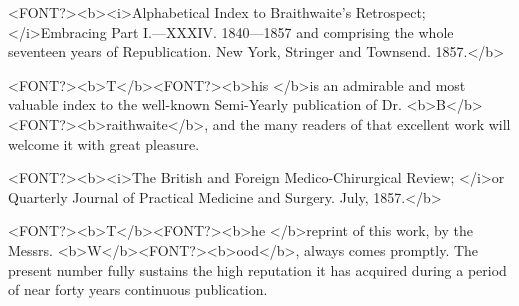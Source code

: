 <FONT?><b><i>Alphabetical Index to Braithwaite's Retrospect; </i>Embracing Part I.---XXXIV. 1840---1857
and comprising the whole seventeen years of Republication. New York, Stringer and
Townsend. 1857.</b>

<FONT?><b>T</b><FONT?><b>his </b>is an admirable and most valuable index to the well-known
Semi-Yearly publication of Dr. <b>B</b><FONT?><b>raithwaite</b>, and the many readers of
that excellent work will welcome it with great pleasure.

<FONT?><b><i>The British and Foreign Medico-Chirurgical Review; </i>or Quarterly Journal of Practical
Medicine and Surgery.   July, 1857.</b>

<FONT?><b>T</b><FONT?><b>he </b>reprint of this work, by the Messrs. <b>W</b><FONT?><b>ood</b>, always comes
promptly. The present number fully sustains the high reputation it
has acquired during a period of near forty years continuous publication.\endinput
